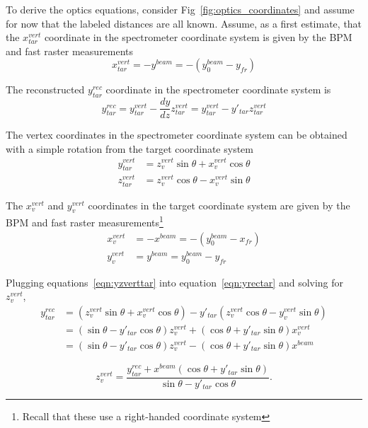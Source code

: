 To derive the optics equations, consider Fig~\ref{fig:optics_coordinates} and
assume for now that the labeled distances are all known.
Assume, as a first estimate, that the $x^{vert}_{tar}$ coordinate in the
spectrometer coordinate system is given by the BPM and fast raster measurements
\begin{equation}
    x^{vert}_{tar} = -y^{beam} = -(y_0^{beam} - y_{fr})
\end{equation}

The reconstructed $y^{rec}_{tar}$ coordinate in the spectrometer coordinate
system is
\begin{equation} \label{eqn:yrectar}
    y^{rec}_{tar} = y^{vert}_{tar} - \frac{dy}{dz} z^{vert}_{tar}
                  = y^{vert}_{tar} - y'_{tar} z^{vert}_{tar}
\end{equation}

The vertex coordinates in the spectrometer coordinate system can be obtained
with a simple rotation from the target coordinate system
\begin{align} \label{eqn:yzverttar}
    y^{vert}_{tar} &= z^{vert}_v \sin\theta + x^{vert}_v \cos\theta \\
    z^{vert}_{tar} &= z^{vert}_v \cos\theta - x^{vert}_v \sin\theta
\end{align}

The $x^{vert}_{v}$ and $y^{vert}_{v}$ coordinates in the
target coordinate system are given by the BPM and fast raster
measurements\footnote{Recall that these use a right-handed coordinate system}
\begin{align}
    x^{vert}_v &= -x^{beam} = -(y_0^{beam} - x_{fr}) \\
    y^{vert}_v &= y^{beam} = y_0^{beam} - y_{fr}
\end{align}

Plugging equations~\ref{eqn:yzverttar} into equation~\ref{eqn:yrectar} and
solving for $z^{vert}_v$,
\begin{align}
    y^{rec}_{tar} &= (z^{vert}_v \sin\theta + x^{vert}_v \cos\theta) -
                     y'_{tar} (z^{vert}_v \cos\theta - y^{vert}_v \sin\theta) \\
                  &= (\sin\theta-y'_{tar}\cos\theta)z^{vert}_v +
                     (\cos\theta + y'_{tar} \sin\theta) x^{vert}_v \\
                  &= (\sin\theta-y'_{tar}\cos\theta)z^{vert}_v -
                     (\cos\theta + y'_{tar} \sin\theta) x^{beam}
\end{align}

\begin{equation}
    z^{vert}_v = \frac{y^{rec}_{tar} + x^{beam} (\cos\theta + y'_{tar} \sin\theta)}
                      {\sin\theta - y'_{tar}\cos\theta}.
\end{equation}

